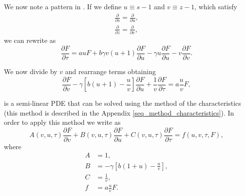 We now note a pattern in . If we define $u \equiv s - 1$ and $v \equiv z - 1$, which satisfy
\begin{align}
  \frac{\partial}{\partial s} = \frac{\partial}{\partial u},\\
  \frac{\partial}{\partial z} = \frac{\partial}{\partial v},
\end{align}
we can rewrite  as
\begin{equation}
  \frac{\partial F}{\partial \tau} =
  a u F
  + b \gamma v \left( u + 1  \right) \frac{\partial F}{\partial u}
  - \gamma u \frac{\partial F}{\partial u}
  - v \frac{\partial F}{\partial v}.
\end{equation}

We now divide by $v$ and rearrange terms obtaining
\begin{equation}
  \frac{\partial F}{\partial v}
  - \gamma \left[ b (u + 1) - \frac{u}{v} \right] \frac{\partial F}{\partial u}
  + \frac{1}{v} \frac{\partial F}{\partial \tau}
  = a \frac{u}{v} F,
  \label{eq_swain_2}
\end{equation}

 is a semi-linear PDE that can be solved using the method of
the characteristics (this method is described in the Appendix
\ref{seq_method_characteristics}). In order to apply this method we write
 as
\begin{equation}
  A(v, u, \tau) \frac{\partial F}{\partial v}
  + B(v, u, \tau) \frac{\partial F}{\partial u}
  + C(v, u, \tau) \frac{\partial F}{\partial \tau}
  = f(u, v, \tau, F),
\end{equation}
where
\begin{equation}
  \begin{aligned}
  A &= 1,\\
  B &= - \gamma \left[ b (1 + u) - \frac{u}{v} \right],\\
  C &= \frac{1}{v},\\
  f &= a \frac{u}{v} F.
  \label{eq_coef_definition}
  \end{aligned}
\end{equation}

